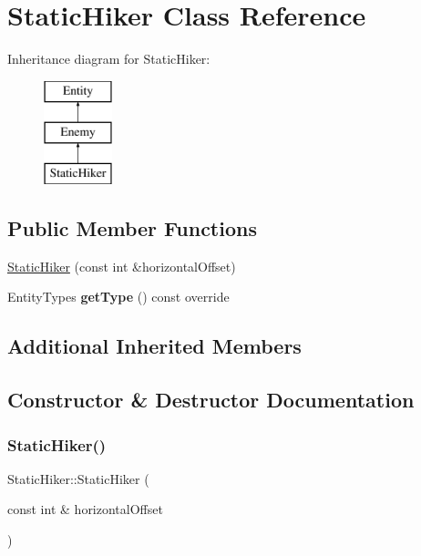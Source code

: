 \hypertarget{class_static_hiker}{}\section{Static\+Hiker Class Reference}
\label{class_static_hiker}
Inheritance diagram for Static\+Hiker\+:\begin{figure}[H]
\begin{center}
\leavevmode
\includegraphics[height=3.000000cm]{class_static_hiker}
\end{center}
\end{figure}
\subsection*{Public Member Functions}
\begin{DoxyCompactItemize}
\item 
\hyperlink{class_static_hiker_abdeca694baaf9fe7e69d968d49a8e75f}{Static\+Hiker} (const int \&horizontal\+Offset)
\item 
\mbox{\label{class_static_hiker_ac24096f5b7efbd98cf17adc968b6ffa6}} 
Entity\+Types {\bfseries get\+Type} () const override
\end{DoxyCompactItemize}
\subsection*{Additional Inherited Members}


\subsection{Constructor \& Destructor Documentation}
\mbox{\label{class_static_hiker_abdeca694baaf9fe7e69d968d49a8e75f}} 
\subsubsection{\texorpdfstring{Static\+Hiker()}{StaticHiker()}}
{\footnotesize\ttfamily Static\+Hiker\+::\+Static\+Hiker (\begin{DoxyParamCaption}\item[{const int \&}]{horizontal\+Offset }\end{DoxyParamCaption})\hspace{0.3cm}{\ttfamily [explicit]}}

